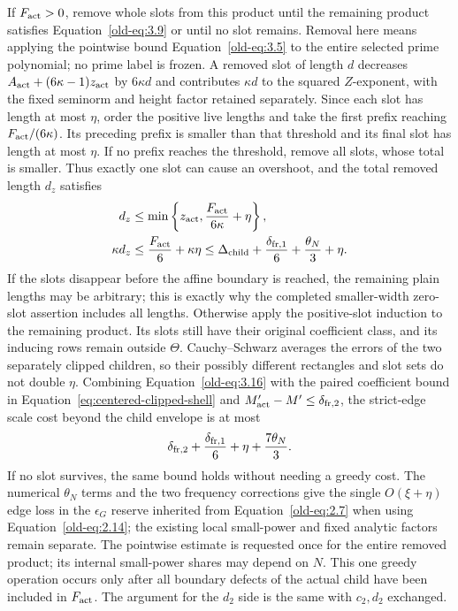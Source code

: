 \documentclass[12pt]{article}
\begin{document}
If \(F_{\rm act}>0\), remove whole slots from this product until the
remaining product satisfies Equation~\eqref{old-eq:3.9} or
until no slot remains.  Removal here means applying the pointwise
bound Equation~\eqref{old-eq:3.5} to the entire selected prime
polynomial; no prime label is frozen.  A removed slot of length
\(d\) decreases \(A_{\rm act}+(6\kappa-1)z_{\rm act}\) by \(6\kappa d\)
and contributes \(\kappa d\) to the squared \(Z\)-exponent, with the
fixed seminorm and height factor retained separately.  Since each
slot has length at most \(\eta\), order the positive live lengths
and take the first prefix reaching \(F_{\rm act}/(6\kappa)\).
Its preceding prefix is smaller than that threshold and its final
slot has length at most \(\eta\).  If no prefix reaches the threshold,
remove all slots, whose total is smaller.  Thus exactly one slot can
cause an overshoot, and the total removed length \(d_z\) satisfies
\begin{equation}
 \begin{split}
 d_z&\le\min\left\{z_{\rm act},
                     \frac{F_{\rm act}}{6\kappa}+\eta\right\},\\
 \kappa d_z&\le\frac{F_{\rm act}}6+\kappa\eta
 \le\Delta_{\rm child}+\frac{\delta_{{\rm fr},1}}6
                       +\frac{\theta_N}{3}+\eta.
 \end{split}
 \label{old-eq:3.16}
\end{equation}
If the slots disappear before the affine boundary is reached, the
remaining plain lengths may be arbitrary; this is exactly why the
completed smaller-width zero-slot assertion includes all lengths.
Otherwise apply the positive-slot induction to the remaining
product.  Its slots still have their original coefficient class,
and its inducing rows remain outside \(\Theta\).  Cauchy--Schwarz
averages the errors of the two separately clipped children, so their
possibly different rectangles and slot sets do not double \(\eta\).
Combining Equation~\eqref{old-eq:3.16} with the paired coefficient
bound in Equation~\eqref{eq:centered-clipped-shell} and
\(M'_{\rm act}-M'\le\delta_{{\rm fr},2}\), the strict-edge scale
cost beyond the child envelope is at most
\begin{equation}
 \delta_{{\rm fr},2}+\frac{\delta_{{\rm fr},1}}6
        +\eta+\frac{7\theta_N}{3}.
 \label{eq:centered-child-edge-cost}
\end{equation}
If no slot survives, the same bound holds without needing a greedy cost.
The numerical \(\theta_N\) terms and the two frequency corrections
give the single \(O(\xi+\eta)\) edge loss in the \(\epsilon_G\)
reserve inherited from Equation~\eqref{old-eq:2.7} when using
Equation~\eqref{old-eq:2.14}; the existing local small-power and fixed
analytic factors remain separate.  The pointwise estimate is requested
once for the entire removed product; its internal small-power shares
may depend on \(N\).  This one greedy operation occurs only after
all boundary defects of the actual child have been included in
\(F_{\rm act}\).  The argument for the \(d_2\)
side is the same with \(c_2,d_2\) exchanged.
\end{document}
